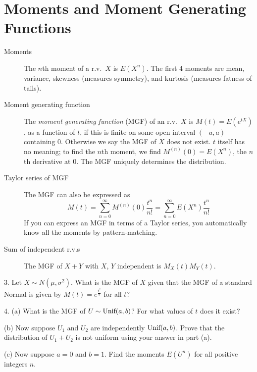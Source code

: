 \documentclass{article}
\begin{document}
\section{Moments and Moment Generating Functions}

\begin{description}
\item[Moments] The $n$th moment of a r.v.~$X$ is $E(X^n)$. The first 4 moments are mean, variance, skewness (measures symmetry), and kurtosis (measures fatness of tails).

\item[Moment generating function] The \textit{moment generating function} (MGF) of an r.v.~$X$ is $M(t) = E(e^{tX})$, as a function of $t$, if this is finite on some open interval $(-a, a)$ containing 0. Otherwise we say the MGF of $X$ does not exist. $t$ itself has no meaning; to find the $n$th moment, we find $M^{(n)}(0) = E(X^n)$, the $n$th derivative at 0. The MGF uniquely determines the distribution. 

\item[Taylor series of MGF] The MGF can also be expressed as $$M(t) = \sum_{n = 0}^\infty M^{(n)}(0)\frac{t^n}{n!} = \sum_{n = 0}^\infty E(X^n)\frac{t^n}{n!}$$ If you can express an MGF in terms of a Taylor series, you automatically know all the moments by pattern-matching.

\item[Sum of independent r.v.s] The MGF of $X + Y$ with $X$, $Y$ independent is $M_X(t)M_Y(t)$.
\end{description}

3. Let $X \sim N(\mu,\sigma^2)$. What is the MGF of $X$ given that the MGF of a standard Normal is given by $M(t) = e^{\frac{t^2}{2}}$ for all $t$? 


4. (a) What is the MGF of $U \sim \textrm{Unif}(a,b)$? For what values of $t$ does it exist?  


(b) Now suppose $U_1$ and $U_2$ are independently $\textrm{Unif}(a,b)$. Prove that the distribution of $U_1+U_2$ is not uniform using your answer in part (a).


(c) Now suppose $a=0$ and $b=1$. Find the moments $E(U^n)$ for all positive integers $n$. 

\end{document}
